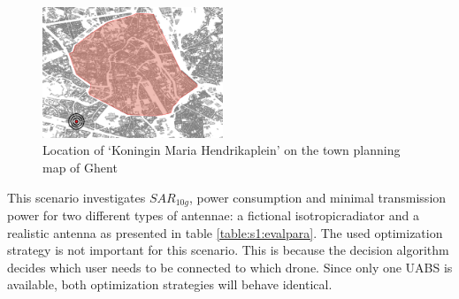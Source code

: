 \begin{figure}
  \begin{center}
    \includegraphics[width=0.48\textwidth]{../images/mariahendrikapleinB.png}
  \end{center}
 \caption{Location of `Koningin Maria Hendrikaplein' on the town planning map of Ghent}
  \label{fig:locationHendrikaplein}
\end{figure}
This scenario investigates $SAR_{10g}$, power consumption and minimal transmission power for two different types of antennae: a 
 fictional \gls{isotropicradiator} and a realistic antenna as presented in table \ref{table:s1:evalpara}.
 The used optimization strategy is not important
for this scenario.
This is because the
 decision algorithm decides which user needs to be connected to which drone. Since only one \gls{UABS} is available,
 both optimization strategies will behave identical. 

